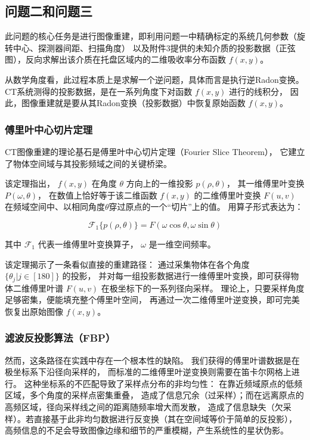 \subsection{问题二和问题三}

此问题的核心任务是进行图像重建，即利用问题一中精确标定的系统几何参数（旋转中心、探测器间距、扫描角度）
以及附件3提供的未知介质的投影数据（正弦图），反向求解出该介质在托盘区域内的二维吸收率分布函数 $f(x,y)$。
\par
从数学角度看，此过程本质上是求解一个逆问题，具体而言是执行逆Radon变换。
CT系统测得的投影数据，是在一系列角度下对函数 $f(x,y)$ 进行的线积分，
因此，图像重建就是要从其Radon变换（投影数据）中恢复原始函数 $f(x,y)$。

\subsubsection{傅里叶中心切片定理}
CT图像重建的理论基石是傅里叶中心切片定理（Fourier Slice Theorem），
它建立了物体空间域与其投影频域之间的关键桥梁。
\par

该定理指出， $f(x,y)$ 在角度 $\theta$ 方向上的一维投影 $p(\rho,\theta)$，
其一维傅里叶变换$P(\omega,\theta)$，
在数值上恰好等于该二维函数 $f(x,y)$ 的二维傅里叶变换 $F(u,v)$ 
在频域空间中、以相同角度$\theta$穿过原点的一个“切片”上的值。
用算子形式表达为：

\begin{equation*}
    \mathcal{F}_1\{p(\rho,\theta)\}=F(\omega\cos\theta,\omega\sin\theta)
\end{equation*}

其中 $\mathcal{F}_1$  代表一维傅里叶变换算子， $\omega$ 是一维空间频率。\par

该定理揭示了一条看似直接的重建路径：
通过采集物体在各个角度 $\{\theta_j|j\in [180] \}$ 的投影，
并对每一组投影数据进行一维傅里叶变换，即可获得物体二维傅里叶谱 $F(u,v)$ 在极坐标下的一系列径向采样。
理论上，只要采样角度足够密集，便能填充整个傅里叶空间，
再通过一次二维傅里叶逆变换，即可完美恢复出原始图像 $f(x,y)$。\par

\subsubsection{滤波反投影算法（FBP）}
然而，这条路径在实践中存在一个根本性的缺陷。
我们获得的傅里叶谱数据是在极坐标系下沿径向采样的，
而标准的二维傅里叶逆变换则需要在笛卡尔网格上进行。
这种坐标系的不匹配导致了采样点分布的非均匀性：
在靠近频域原点的低频区域，多个角度的采样点密集重叠，
造成了信息冗余（过采样）；而在远离原点的高频区域，径向采样线之间的距离随频率增大而发散，
造成了信息缺失（欠采样）。若直接基于此非均匀数据进行反变换（其在空间域等价于简单的反投影），
高频信息的不足会导致图像边缘和细节的严重模糊，产生系统性的星状伪影。

